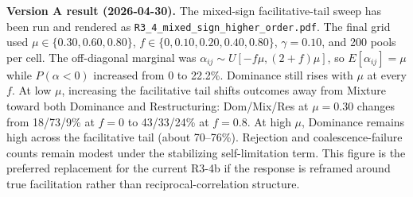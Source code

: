 \documentclass[11pt]{article}
\begin{document}
\noindent\textbf{Version A result (2026-04-30).}
The mixed-sign facilitative-tail sweep has been run and rendered as \texttt{R3\_4\_mixed\_sign\_higher\_order.pdf}. The final grid used $\mu \in \{0.30,0.60,0.80\}$, $f \in \{0,0.10,0.20,0.40,0.80\}$, $\gamma=0.10$, and 200 pools per cell. The off-diagonal marginal was $\alpha_{ij}\sim U[-f\mu,(2+f)\mu]$, so $E[\alpha_{ij}]=\mu$ while $P(\alpha<0)$ increased from 0 to 22.2\%. Dominance still rises with $\mu$ at every $f$. At low $\mu$, increasing the facilitative tail shifts outcomes away from Mixture toward both Dominance and Restructuring: Dom/Mix/Res at $\mu=0.30$ changes from 18/73/9\% at $f=0$ to 43/33/24\% at $f=0.8$. At high $\mu$, Dominance remains high across the facilitative tail (about 70--76\%). Rejection and coalescence-failure counts remain modest under the stabilizing self-limitation term. This figure is the preferred replacement for the current R3-4b if the response is reframed around true facilitation rather than reciprocal-correlation structure.
\end{document}
